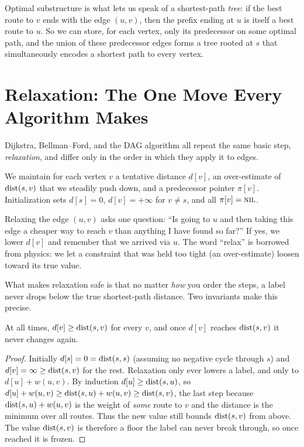 Optimal substructure is what lets us speak of a shortest-path \emph{tree}: if the best
route to $v$ ends with the edge $(u,v)$, then the prefix ending at $u$ is itself a best
route to $u$. So we can store, for each vertex, only its predecessor on some optimal path,
and the union of these predecessor edges forms a tree rooted at $s$ that simultaneously
encodes a shortest path to every vertex.

\section{Relaxation: The One Move Every Algorithm Makes}
\label{ch07:relaxation}

Dijkstra, Bellman--Ford, and the DAG algorithm all repeat the same basic step,
\emph{relaxation}, and differ only in the order in which they apply it to edges.

We maintain for each vertex $v$ a tentative distance $d[v]$, an over-estimate of
$\operatorname{dist}(s,v)$ that we steadily push down, and a predecessor pointer $\pi[v]$. Initialization
sets $d[s]=0$, $d[v]=+\infty$ for $v\neq s$, and all $\pi[v]=\textsc{nil}$.

\begin{algorithm}[H]
\DontPrintSemicolon
\caption{\textsc{Relax}$(u,v,w)$ -- the atomic step}
\end{algorithm}

\begin{intuitionbox}
Relaxing the edge $(u,v)$ asks one question: ``Is going to $u$ and then taking this edge a
cheaper way to reach $v$ than anything I have found so far?'' If yes, we lower $d[v]$ and
remember that we arrived via $u$. The word ``relax'' is borrowed from physics: we let a
constraint that was held too tight (an over-estimate) loosen toward its true value.
\end{intuitionbox}

What makes relaxation safe is that no matter \emph{how} you order the steps, a label
never drops below the true shortest-path distance. Two invariants make this precise.

\begin{lemma}
\label{ch07:ub-invariant}
At all times, $d[v]\ge \operatorname{dist}(s,v)$ for every $v$, and once $d[v]$ reaches $\operatorname{dist}(s,v)$ it
never changes again.
\end{lemma}

\begin{proof}
Initially $d[s]=0=\operatorname{dist}(s,s)$ (assuming no negative cycle through $s$) and $d[v]=\infty\ge
\operatorname{dist}(s,v)$ for the rest. Relaxation only ever lowers a label, and only to $d[u]+w(u,v)$. By
induction $d[u]\ge\operatorname{dist}(s,u)$, so $d[u]+w(u,v)\ge \operatorname{dist}(s,u)+w(u,v)\ge \operatorname{dist}(s,v)$, the last
step because $\operatorname{dist}(s,u)+w(u,v)$ is the weight of \emph{some} route to $v$ and the distance
is the minimum over all routes. Thus the new value still bounds $\operatorname{dist}(s,v)$ from above. The
value $\operatorname{dist}(s,v)$ is therefore a floor the label can never break through, so once reached
it is frozen.
\end{proof}

